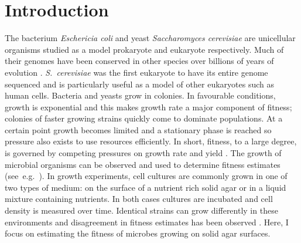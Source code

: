 \graphicspath{{images/}}

\section{Introduction}
\label{sec:introduction}

The bacterium \textit{Eschericia coli} and yeast \textit{Saccharomyces
  cerevisiae} are unicellular organisms studied as a model prokaryote
and eukaryote respectively.
Much of their genomes have been conserved in other species over
billions of years of evolution
\citep{OBrien2005inparanoid}. \textit{S.~cerevisiae} was the first
eukaryote to have its entire genome sequenced \citep{goffeau1996life}
and is particularly useful as a model of other eukaryotes such as
human cells. Bacteria and yeasts grow in colonies. In favourable
conditions, growth is exponential and this makes growth rate a major
component of fitness; colonies of faster growing strains quickly come
to dominate populations. At a certain point growth becomes limited and
a stationary phase is reached so pressure also exists to use resources
efficiently. In short, fitness, to a large degree, is governed by
competing pressures on growth rate and yield
\citep{dethlefsen2007performance}. The growth of microbial organisms
can be observed and used to determine fitness estimates
(see~e.g.~\citet{Baryshnikova2010,Addinall2011}). In growth
experiments, cell cultures are commonly grown in one of two types of
medium: on the surface of a nutrient rich solid agar or in a liquid
mixture containing nutrients. In both cases cultures are incubated and
cell density is measured over time. Identical strains can grow
differently in these environments and disagreement in fitness
estimates has been observed \citep{Baryshnikova2010}. Here, I focus on
estimating the fitness of microbes growing on solid agar surfaces.


